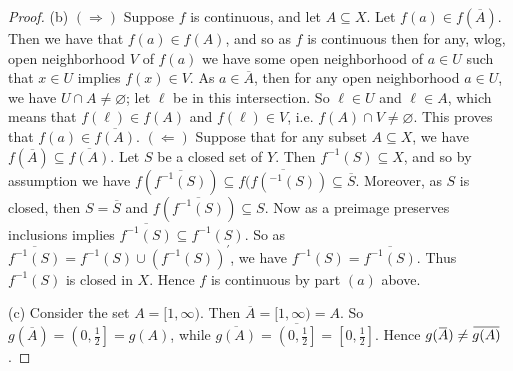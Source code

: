 \documentclass[oneside]{amsart}
\theoremstyle{definition}
\newcommand{\overbar}[1]{\mkern 1.5mu\overline{\mkern-1.5mu#1\mkern-1.5mu}\mkern 1.5mu}
\begin{document}
\begin{tcolorbox}[colback=black!5!white,colframe=black!75!black,title= Chapter 5; $\S 2.1$: Exercise $2.3.$]
\begin{proof}
(b) $(\Rightarrow)$ Suppose $f$ is continuous, and let $A \subseteq X$. Let $f(a) \in f(\overline{A})$. Then we have that $f(a) \in f(A)$, and so as $f$ is continuous then for any, wlog, open neighborhood $V$ of $f(a)$ we have some open neighborhood of $a \in U$ such that $x \in U $ implies $f(x) \in V$. As $a \in \overline{A}$, then for any open neighborhood $a \in U$, we have $U \cap A \neq \varnothing$; let $\ell$ be in this intersection. So $\ell \in U$ and $\ell \in A$, which means that $f(\ell) \in f(A)$ and $f(\ell) \in V$, i.e. $f(A) \cap V \neq \varnothing$. This proves that $f(a) \in \overline{f(A)}$. $(\Leftarrow)$ Suppose that for any subset $A \subseteq X$, we have $f(\overline{A}) \subseteq \overline{f(A)}$. Let $S$ be a closed set of $Y$. Then $ f^{-1}(S) \subseteq X$, and so by assumption we have $f(\overline{ f^{-1}(S)}) \subseteq \overline{ f(f(^{-1}(S) )} \subseteq \overline{S}$. Moreover, as $S$ is closed, then $S = \overline{S}$ and $f( \overline{f^{-1}(S) }) \subseteq S$. Now as a preimage preserves inclusions implies $\overline{f^{-1}(S)} \subseteq f^{-1}(S)$. So as $\overline{f^{-1}(S)} = f^{-1} (S) \cup (f^{-1}(S))^\prime$, we have $f^{-1}(S) = \overline{f^{-1}(S)}$. Thus $f^{-1}(S)$ is closed in $X$. Hence $f$ is continuous by part $(a)$ above.

(c) Consider the set $A = [1, \infty)$. Then $\overline{A} = [1, \infty ) = A$. So $g(\overline{A}) = \left( 0, \frac{1}{2} \right ] = g(A)$, while $ \overline{g(A)} = \overline{\left(0, \frac{1}{2} \right ]} = \left [0, \frac{1}{2} \right]$. Hence $g(\overbar{A}) \neq \overbar{g(A)}$. 
\end{proof}
\end{tcolorbox}
\end{document}
